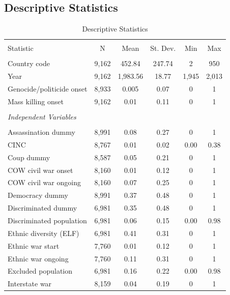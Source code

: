 \documentclass[a4paper,12pt]{article}
\begin{document}
\newpage

\subsection{Descriptive Statistics}
\label{sec:mk-ds}

\begin{table}[!htbp] \centering 
  \caption{Descriptive Statistics} 
  \label{tab:mk-ds} 
\footnotesize 
\begin{tabular}{@{\extracolsep{5pt}}lccccc} 
\\[-1.8ex]\hline 
\hline \\[-1.8ex] 
Statistic & \multicolumn{1}{c}{N} & \multicolumn{1}{c}{Mean} & \multicolumn{1}{c}{St. Dev.} & \multicolumn{1}{c}{Min} & \multicolumn{1}{c}{Max} \\ 
\hline \\[-1.8ex] 
Country code & 9,162 & 452.84 & 247.74 & 2 & 950 \\ 
Year & 9,162 & 1,983.56 & 18.77 & 1,945 & 2,013 \\ 
Genocide/politicide onset & 8,933 & 0.005 & 0.07 & 0 & 1\\ 
Mass killing onset & 9,162 & 0.01 & 0.11 & 0 & 1 \\ 
&&&&&\\
\textit{Independent Variables} & & & & \\
&&&&&\\
Assassination dummy & 8,991 & 0.08 & 0.27 & 0 & 1 \\ 
CINC & 8,767 & 0.01 & 0.02 & 0.00 & 0.38 \\ 
Coup dummy & 8,587 & 0.05 & 0.21 & 0 & 1 \\ 
COW civil war onset & 8,160 & 0.01 & 0.12 & 0 & 1 \\ 
COW civil war ongoing & 8,160 & 0.07 & 0.25 & 0 & 1 \\ 
Democracy dummy & 8,991 & 0.37 & 0.48 & 0 & 1 \\ 
Discriminated dummy & 6,981 & 0.35 & 0.48 & 0 & 1 \\ 
Discriminated population & 6,981 & 0.06 & 0.15 & 0.00 & 0.98 \\ 
Ethnic diversity (ELF) & 6,981 & 0.41 & 0.31 & 0 & 1 \\ 
Ethnic war start & 7,760 & 0.01 & 0.12 & 0 & 1 \\ 
Ethnic war ongoing & 7,760 & 0.11 & 0.31 & 0 & 1 \\ 
Excluded population & 6,981 & 0.16 & 0.22 & 0.00 & 0.98 \\ 
Interstate war & 8,159 & 0.04 & 0.19 & 0 & 1 \\ 

\end{tabular}
\end{table}
\end{document}
